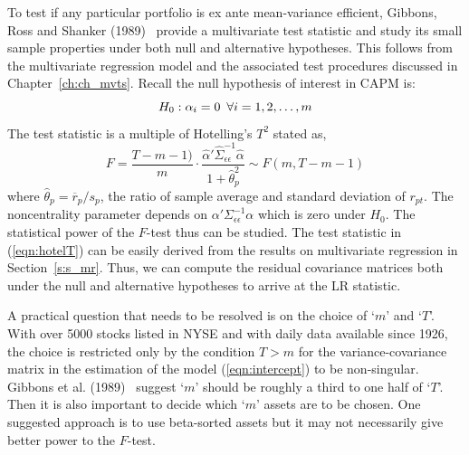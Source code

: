To test if any particular portfolio is ex ante mean-variance efficient, Gibbons, Ross and Shanker (1989)~\cite{gibbons} provide a multivariate test statistic and study its small sample properties under both null and alternative hypotheses. This follows from the multivariate regression model and the associated test procedures discussed in Chapter~\ref{ch:ch_mvts}. Recall the null hypothesis of interest in CAPM is:
	\begin{equation}\label{eqn:secnull}
	H_0: \alpha_i=0 \enskip \forall i=1,2,\ldots,m
	\end{equation}
The test statistic is a multiple of Hotelling's $T^2$ stated as,
	\begin{equation}\label{eqn:hotelT}
	F= \dfrac{T-m-1)}{m} \cdot \dfrac{\hat{\alpha}' \hat{\Sigma}_{\epsilon\epsilon}^{-1} \hat{\alpha}}{1+\hat{\theta}_p^2} \sim F(m,T-m-1)
	\end{equation}	
where $\hat{\theta}_p= \overline{r}_p/s_p$, the ratio of sample average and standard deviation of $r_{pt}$. The noncentrality parameter depends on $\alpha' \Sigma_{\epsilon\epsilon}^{-1} \alpha$ which is zero under $H_0$. The statistical power of the $F$-test thus can be studied. The test statistic in (\ref{eqn:hotelT}) can be easily derived from the results on multivariate regression in Section~\ref{s:s_mr}. Thus, we can compute the residual covariance matrices both under the null and alternative hypotheses to arrive at the LR statistic. 


A practical question that needs to be resolved is on the choice of `$m$' and `$T$'. With over 5000 stocks listed in NYSE and with daily data available since 1926, the choice is restricted only by the condition $T>m$ for the variance-covariance matrix in the estimation of the model (\ref{eqn:intercept}) to be non-singular. Gibbons et al. (1989)~\cite{gibbons} suggest `$m$' should be roughly a third to one half of `$T$'. Then it is also important to decide which `$m$' assets are to be chosen. One suggested approach is to use beta-sorted assets but it may not necessarily give better power to the $F$-test. 
	
